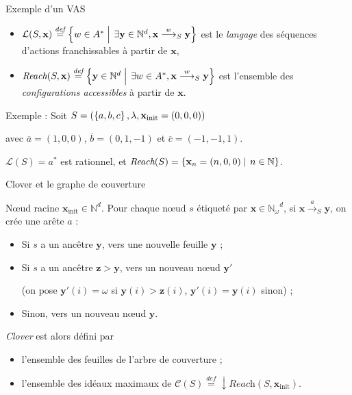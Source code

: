 \documentclass[french]{beamer}
\newcommand{\set}[2]{\left\{#1\mathrel{\left|\vphantom{#1}\vphantom{#2}\right.}#2\right\}}
\newcommand{\os}[1]{\left\{\mathinner{#1}\right\}}
\newcommand{\defeq}{\ensuremath{\stackrel{\textit{def}}{=}}}
\newcommand{\N}{\ensuremath{\mathbb{N}}}
\newcommand{\Nomega}{\ensuremath{\mathbb{N}_\omega}}
\newcommand{\lang}{\ensuremath{\mathcal{L}}}
\newcommand{\reach}{\ensuremath{\textit{Reach}}}
\newcommand{\cover}{\ensuremath{\mathcal{C}}}
\newcommand{\trans}[2]{\ensuremath{\stackrel{#1}{\longrightarrow}_{#2}}}
\newcommand{\vect}[1]{\ensuremath{\mathbf{#1}}}
\newcommand{\xinit}{\ensuremath{\vect{x}_\text{init}}}
\newcommand{\valeur}[1]{\ensuremath{\overline{#1}}}
\let\oldemph\emph
\renewcommand{\emph}[1]{\oldemph{\color{blue}#1}}
\begin{document}
\begin{frame}{Exemple d'un VAS}
\begin{definition}[Langage]
\begin{itemize}
    \item 
    $\lang(S,\vect{x})\defeq \set{w\in A^\ast} {\exists \vect{y}\in\N^d, \vect{x}\trans{w}{S}\vect{y}}$ est le \emph{langage} des séquences d'actions franchissables à partir de $\vect{x}$,
    
    \item $\reach(S,\vect{x})\defeq \set{\vect{y}\in\N^d} {\exists w\in A^\ast, \vect{x}\trans{w}{S} \vect{y}}$ est l'ensemble des \emph{configurations accessibles} à partir de $\vect{x}$. 
\end{itemize}
\end{definition}

\vspace{3mm}
Exemple : 
Soit $S = (\os{a,b,c}, \lambda, \xinit=(0,0,0))$ 

avec $\valeur{a}=(1,0,0)$, $\valeur{b}=(0,1,-1)$ et $\valeur{c}=(-1,-1,1)$.

\vspace{3mm}
$\lang(S)= a^\ast$ est rationnel, et $\reach(S)= \set{\vect{x}_n= (n,0,0)} {n\in\N}$.
\end{frame}


\begin{frame}{Clover et le graphe de couverture}
\begin{definition}
Nœud racine $\xinit \in\N^d$.
Pour chaque nœud $s$ étiqueté par $\vect{x}\in\Nomega^d$, si $\vect{x} \trans{a}{S} \vect{y}$, on crée une arête $a$ :
\begin{itemize}
    \item Si $s$ a un ancêtre $\vect{y}$, vers une nouvelle feuille $\vect{y}$ ;
    \item Si $s$ a un ancêtre $\vect{z} > \vect{y}$, vers un nouveau nœud $\vect{y'}$
    
    (on pose $\vect{y'}(i)= \omega$ si $\vect{y}(i)>\vect{z}(i)$, $\vect{y'}(i)= \vect{y}(i)$ sinon) ;
    \item Sinon, vers un nouveau nœud $\vect{y}$.
\end{itemize}
\end{definition}

\vspace{3mm}
\emph{Clover} est alors défini par
\begin{itemize}
    \item l'ensemble des feuilles de l'arbre de couverture ;
    \item l'ensemble des idéaux maximaux de $\cover(S) \defeq \downarrow \reach(S,\xinit)$.
\end{itemize}
\end{frame}
\end{document}
